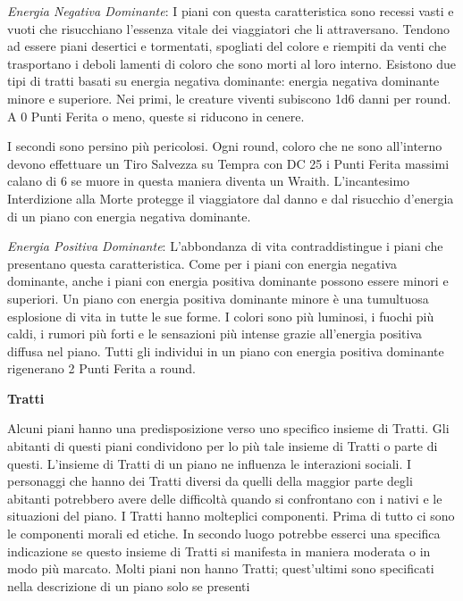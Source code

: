 \documentclass[a4paper,twoside,openany]{book}
\begin{document}
\begin{multicols}{2}
\emph{Energia Negativa Dominante}: I piani con questa caratteristica sono recessi vasti e vuoti che risucchiano l'essenza vitale dei viaggiatori che li attraversano. Tendono ad essere piani desertici e tormentati, spogliati del colore e riempiti da venti che trasportano i deboli lamenti di coloro che sono morti al loro interno. Esistono due tipi di tratti basati su energia negativa dominante: energia negativa dominante minore e superiore. Nei primi, le creature viventi subiscono 1d6 danni per round. A 0 Punti Ferita o meno, queste si riducono in cenere.

I secondi sono persino più pericolosi. Ogni round, coloro che ne sono all'interno devono effettuare un Tiro Salvezza su Tempra con DC 25 i Punti Ferita massimi calano di 6 se muore in questa maniera diventa un Wraith. L'incantesimo Interdizione alla Morte protegge il viaggiatore dal danno e dal risucchio d'energia di un piano con energia negativa dominante.

\emph{Energia Positiva Dominante}: L'abbondanza di vita contraddistingue i piani che presentano questa caratteristica. Come per i piani con energia negativa dominante, anche i piani con energia positiva dominante possono essere minori e superiori.
Un piano con energia positiva dominante minore è una tumultuosa esplosione di vita in tutte le sue forme. I colori sono più luminosi, i fuochi più caldi, i rumori più forti e le sensazioni più intense grazie all'energia positiva diffusa nel piano. Tutti gli individui in un piano con energia positiva dominante rigenerano 2 Punti Ferita a round.

\medskip

\textbf{Tratti}

\medskip

Alcuni piani hanno una predisposizione verso uno specifico insieme di Tratti. Gli abitanti di questi piani condividono per lo più tale insieme di Tratti o parte di questi. L'insieme di Tratti di un piano ne influenza le interazioni sociali. I personaggi che hanno dei Tratti diversi da quelli della maggior parte degli abitanti potrebbero avere delle difficoltà quando si confrontano con i nativi e le situazioni del piano. I Tratti hanno molteplici componenti. Prima di tutto ci sono le componenti morali ed etiche. In secondo luogo potrebbe esserci una specifica indicazione se questo insieme di Tratti si manifesta in maniera moderata o in modo più marcato. Molti piani non hanno Tratti; quest'ultimi sono specificati nella descrizione di un piano solo se presenti


\end{multicols}
\end{document}
